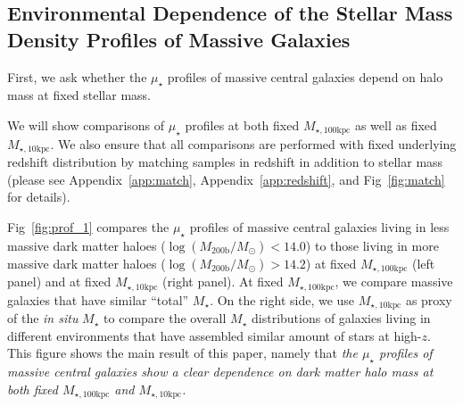 \documentclass[a4paper,fleqn,usenatbib]{mnras}
\def\etal{{\ et al.~}}
\def\mstar{{$M_{\star}$}}
\def\logmh{{$\log (M_{\mathrm{200b}}/M_{\odot})$}}
\def\minn{{$M_{\star,10\mathrm{kpc}}$}}
\def\mtot{{$M_{\star,100\mathrm{kpc}}$}}
\def\mden{{$\mu_{\star}$}}
\begin{document}

\subsection{Environmental Dependence of the Stellar Mass Density Profiles of Massive 
            Galaxies}
    \label{ssec:sbp_mtot} 
       
    First, we ask whether the \mden{} profiles of massive central galaxies depend on 
    halo mass at fixed stellar mass.
    
    We will show comparisons of \mden{} profiles at both fixed \mtot{} as well as fixed 
    \minn{}. 
    We also ensure that all comparisons are performed with fixed underlying redshift
    distribution by matching samples in redshift in addition to stellar mass
    (please see Appendix~\ref{app:match}, Appendix~\ref{app:redshift}, 
    and Fig~\ref{fig:match} for details). 
    
   
    Fig~\ref{fig:prof_1} compares the \mden{} profiles of massive central galaxies 
    living in less massive dark matter haloes (\logmh$<14.0$) to those living in more 
    massive dark matter haloes (\logmh$>14.2$) at fixed \mtot{} (left panel) and at 
    fixed \minn{} (right panel). 
    At fixed \mtot{}, we compare massive galaxies that have similar ``total'' \mstar{}. 
    On the right side, we use \minn{} as proxy of the \textit{in situ} \mstar{} to 
    compare the overall \mstar{} distributions of galaxies living in different 
    environments that have assembled similar amount of stars at high-$z$.
    This figure shows the main result of this paper, namely that 
    \emph{the \mden{} profiles of massive central galaxies show a clear dependence on 
    dark matter halo mass at both fixed \mtot{} and \minn{}.}
\end{document}
